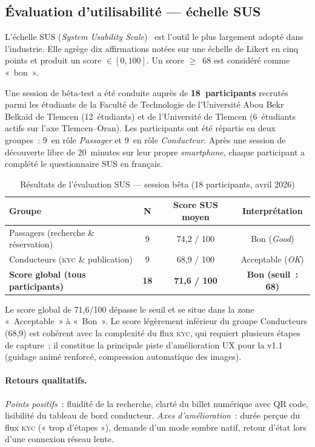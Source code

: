 \documentclass[12pt, a4paper, oneside]{report}
\begin{document}
\subsection{Évaluation d'utilisabilité --- échelle SUS}

L'échelle SUS (\textit{System Usability Scale})~\cite{brooke_sus_1996} est l'outil le plus largement adopté dans l'industrie. Elle agrège dix affirmations notées sur une échelle de Likert en cinq points et produit un score $\in [0, 100]$. Un score $\geq$~68 est considéré comme «~bon~».

Une session de bêta-test a été conduite auprès de \textbf{18~participants} recrutés parmi les étudiants de la Faculté de Technologie de l'Université Abou Bekr Belkaïd de Tlemcen (12~étudiants) et de l'Université de Tlemcen (6~étudiants actifs sur l'axe Tlemcen--Oran). Les participants ont été répartis en deux groupes~: 9~en rôle \textit{Passager} et 9~en rôle \textit{Conducteur}. Après une session de découverte libre de 20~minutes sur leur propre \textit{smartphone}, chaque participant a complété le questionnaire SUS en français.

\begin{table}[H]
\centering
\footnotesize
\begin{tabularx}{\textwidth}{|X|c|c|c|}
\hline
\rowcolor{rohlight}
\textbf{Groupe} & \textbf{N} & \textbf{Score SUS moyen} & \textbf{Interprétation} \\
\hline
Passagers (recherche \& réservation) & 9 & 74,2 / 100 & Bon (\textit{Good}) \\
\hline
Conducteurs (\textsc{kyc} \& publication) & 9 & 68,9 / 100 & Acceptable (\textit{OK}) \\
\hline
\rowcolor{rohlight!20}
\textbf{Score global (tous participants)} & \textbf{18} & \textbf{71,6 / 100} & \textbf{Bon (seuil~: 68)} \\
\hline
\end{tabularx}
  \caption{Résultats de l'évaluation SUS --- session bêta (18 participants, avril 2026)}
  \label{tab:sus}
\end{table}

Le score global de 71,6/100 dépasse le seuil et se situe dans la zone «~Acceptable~» à «~Bon~». Le score légèrement inférieur du groupe Conducteurs (68,9) est cohérent avec la complexité du flux \textsc{kyc}, qui requiert plusieurs étapes de capture~; il constitue la principale piste d'amélioration UX pour la v1.1 (guidage animé renforcé, compression automatique des images).

\paragraph{Retours qualitatifs.} \textit{Points positifs}~: fluidité de la recherche, clarté du billet numérique avec QR code, lisibilité du tableau de bord conducteur. \textit{Axes d'amélioration}~: durée perçue du flux \textsc{kyc} (« trop d'étapes »), demande d'un mode sombre natif, retour d'état lors d'une connexion réseau lente.
\end{document}
